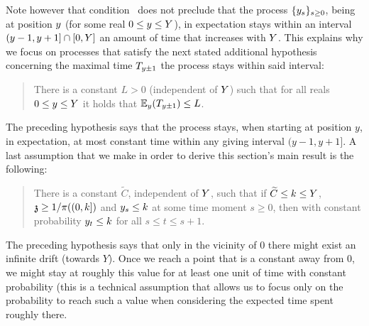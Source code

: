 	Note however that condition~  does not preclude that the process $\{\auxy_s\}_{s\geq 0}$, being at position $\auxy$ (for some real $0 \le \auxy \le \auxY$), in expectation stays within an interval $(y-1,y+1] \cap [0,\auxY]$ an amount of time that increases with $\auxY$. This explains why we focus on processes that satisfy the next stated additional hypothesis concerning the maximal time $T_{\auxy\pm 1}$   the process stays within said interval:
	\begin{quote}
	    There is a constant $L>0$  (independent of $\auxY$) such that 
	   for all reals $0\leq \auxy \le \auxY$ it holds that 
	   $\EE_{y}(T_{\auxy\pm 1})\le L$.
	\end{quote}
	The preceding hypothesis says that the process stays, when starting at position $y$, in expectation, at most constant time within any giving interval $(y-1,y+1]$.
	A last assumption that we make in order to derive this section's main result is the following: 
	\begin{quote}
	    There is a constant
	   $\widetilde{C}$, independent of $\auxY$, such that if $\widetilde{C}\le k\le \auxY$, $\ss\geq 1/\pi((0,k])$ and 
	   $\auxy_s \le k$ at some time moment $s\ge 0$, then with constant probability $\auxy_t \le k$ for all $s \le t \le s+1$.%
	\end{quote}
	The preceding hypothesis says that only in the vicinity of $0$ there might exist an infinite drift (towards $Y$). Once we reach a point that is a constant away from $0$, we might stay at roughly this value for at least one unit of time with constant probability (this is a technical assumption that allows us to focus only on the probability to reach such a value when considering the expected time spent roughly there.
	
